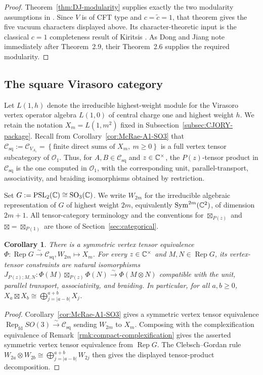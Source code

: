 \documentclass[10pt,a4paper]{amsart}
\numberwithin{equation}{section} \newtheorem{thm}{Theorem}[section] \newtheorem{lem}[thm]{Lemma} \newtheorem{ex}[thm]{Example} \newtheorem{prop}[thm]{Proposition} \newtheorem{cor}[thm]{Corollary} \newtheorem{defi}[thm]{Definition} \newtheorem{rmk}[thm]{Remark} \newtheorem{notation}[thm]{Notation}
\newcommand{\Rep}{\operatorname{Rep}}
\newcommand{\Sym}{\operatorname{Sym}}
\newcommand{\SO}{\operatorname{SO}}
\newcommand{\Csq}{\mathcal C_{\mathrm{sq}}}
\newcommand{\Ovir}{\mathcal O_1}
\newcommand{\PSLtwo}{\operatorname{PSL}_2(\C)}
\begin{document}
\begin{proof}
Theorem~\ref{thm:DJ-modularity} supplies exactly the two modularity assumptions in \cite[Theorem~2.9]{DJA4}. Since $V$ is of CFT type and $c=\widetilde c=1$, that theorem gives the five vacuum characters displayed above. Its character-theoretic input is the classical $c=1$ completeness result of Kiritsis \cite{Kiritsis}. As Dong and Jiang note immediately after Theorem~2.9, their Theorem~2.6 supplies the required modularity.
\end{proof}

\subsection{The square Virasoro category}

Let $L(1,h)$ denote the irreducible highest-weight module for the Virasoro vertex operator algebra $L(1,0)$ of central charge one and highest weight $h$. We retain the notation $X_m=L(1,m^2)$ fixed in Subsection~\ref{subsec:CJORY-package}. Recall from Corollary~\ref{cor:McRae-A1-SO3} that \(\Csq:=\mathcal C_{V_{A_1}}=\left\{\text{finite direct sums of }X_m,\ m\ge0\right\}\) is a full vertex tensor subcategory of $\Ovir$. Thus, for $A,B\in\Csq$ and $z\in\mathbb{C}^\times$, the $P(z)$-tensor product in $\Csq$ is the one computed in $\Ovir$, with the corresponding unit, parallel-transport, associativity, and braiding isomorphisms obtained by restriction.

Set $G:=\PSLtwo\cong\SO_3(\C)$. We write $W_{2m}$ for the irreducible algebraic representation of $G$ of highest weight $2m$, equivalently $\Sym^{2m}(\C^2)$, of dimension $2m+1$. All tensor-category terminology and the conventions for $\boxtimes_{P(z)}$ and $\boxtimes=\boxtimes_{P(1)}$ are those of Section~\ref{sec:categorical}.

\begin{cor}
\label{thm:square-category}
There is a symmetric vertex tensor equivalence \(\Phi:\Rep G\overset{\sim}{\longrightarrow}\Csq, W_{2m}\longmapsto X_m\). For every $z\in\mathbb{C}^\times$ and $M,N\in\Rep G$, its vertex-tensor constraints are natural isomorphisms \(J_{P(z);M,N}:\Phi(M)\boxtimes_{P(z)}\Phi(N)\overset{\sim}{\longrightarrow}\Phi(M\otimes N)\) compatible with the unit, parallel transport, associativity, and braiding. In particular, for all $a,b\ge0$, \(X_a\boxtimes X_b\cong\bigoplus_{j=|a-b|}^{a+b}X_j\).
\end{cor}

\begin{proof}
Corollary~\ref{cor:McRae-A1-SO3} gives a symmetric vertex tensor equivalence \(\Rep_{\mathrm{fd}}SO(3)\overset{\sim}{\longrightarrow}\Csq\) sending \(W_{2m}\) to \(X_m\). Composing with the complexification equivalence of Remark~\ref{rmk:compact-complexification} gives the asserted symmetric vertex tensor equivalence from $\Rep G$. The Clebsch--Gordan rule \(W_{2a}\otimes W_{2b}\cong\bigoplus_{j=|a-b|}^{a+b}W_{2j}\) then gives the displayed tensor-product decomposition.
\end{proof}
\end{document}
